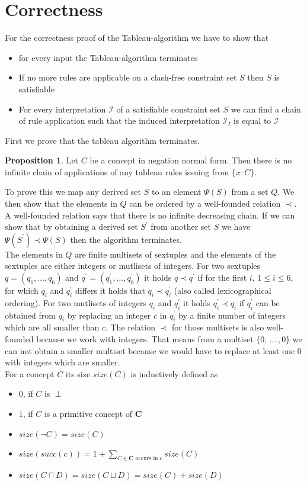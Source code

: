 \documentclass[a4paper,11pt]{scrartcl}
\theoremstyle{break}
\theoremstyle{definition}
\newtheorem{mypro}{Proposition}
\begin{document}
\section{Correctness}
For the correctness proof of the Tableau-algorithm we have to show that
\begin{itemize}
\item for every input the Tableau-algorithm terminates
\item If no more rules are applicable on a clash-free constraint set $S$ then $S$ is satisfiable
\item For every interpretation $\mathcal{I}$ of a satisfiable constraint set $S$ we can find a chain of rule application such that the induced interpretation $\mathcal{I}_I$ is equal to $\mathcal{I}$
\end{itemize}
First we prove that the tableau algorithm terminates. 
\begin{mypro}
Let $C$ be a concept in negation normal form. Then there is no infinite chain of applications of any tableau rules issuing from $\{x:C\}$. 
\end{mypro}
To prove this we map any derived set $S$ to an element $\Psi(S)$ from a set $Q$. We then show that the elements in $Q$ can be ordered by a well-founded relation $\prec$. A well-founded relation says that there is no infinite decreasing chain. If we can show that by obtaining a derived set $S^\prime$ from another set $S$ we have $\Psi(S^\prime)\prec\Psi(S)$ then the algorithm terminates.\\
The elements in $Q$ are finite multisets of sextuples and the elements of the sextuples are either integers or mutlisets of integers. For two sextuples $q=(q_1,\dots,q_6)$ and $q^\prime=(q^\prime_1,\dots,q^\prime_6)$ it holds $q\prec q^\prime$ if for the first $i,\, 1\leq i\leq 6$, for which $q_i$ and $q_i^\prime$ differs it holds that $q_i\prec q_i^\prime$ (also called lexicographical ordering). For two mutlisets of integers $q_i$ and $q_i^\prime$ it holds $q_i^\prime\prec q_i$ if $q_i^\prime$ can be obtained from $q_i$ by replacing an integer $c$ in $q_i^\prime$ by a finite number of integers which are all smaller than $c$. The relation $\prec$ for those multisets is also well-founded because we work with integers. That means from a multiset $\{0,\,\dots\,,0\}$ we can not obtain a smaller multiset because we would have to replace at least one $0$ with integers which are smaller.\\
For a concept $C$ its size $size(C)$ is inductively defined as
\begin{itemize}
\item $0$, if $C$ is $\perp$
\item $1$, if $C$ is a primitive concept of $\mathbf{C}$
\item $size(\neg C)=size(C)$
\item $size(succ(c))= 1 + \sum_{C\in\mathbf{C}\text{ occurs in c}} size(C)$
\item $size(C\sqcap D)=size(C\sqcup D)=size(C)+size(D)$
\end{itemize}
\end{document}
